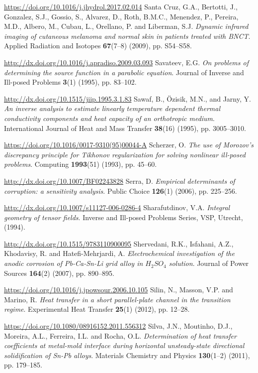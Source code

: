 \begin{thebibliography}{301}
\url{https://doi.org/10.1016/j.jhydrol.2017.02.014}
%
%
 Santa Cruz, G.A., Bertotti, J., Gonzalez, S.J., Gossio, S., Alvarez, D., Roth, B.M.C., Menendez, P., Pereira, M.D., Albero, M., Cubau, L., Orellano, P. and Liberman, S.J. {\it Dynamic infrared imaging of cutaneous melanoma and normal skin in patients treated with BNCT}. Applied Radiation and Isotopes {\bf 67}(7--8) (2009), pp. S54--S58.

\url{http://dx.doi.org/10.1016/j.apradiso.2009.03.093}
%
%
 Savateev, E.G. {\it On problems of determining the source function in a parabolic equation}. Journal of Inverse and Ill-posed Problems {\bf 3}(1) (1995), pp. 83--102.

\url{http://dx.doi.org/10.1515/jiip.1995.3.1.83}
%
%
 Sawaf, B., \"Ozisik, M.N., and Jarny, Y. {\it An inverse analysis to estimate linearly temperature dependent thermal conductivity components and heat capacity of an orthotropic medium}. International Journal of Heat and Mass Transfer {\bf 38}(16) (1995), pp. 3005--3010.

\url{https://doi.org/10.1016/0017-9310(95)00044-A}
%
%
 Scherzer, O. {\it The use of Morozov's discrepancy principle for Tikhonov regularization for solving nonlinear ill-posed problems}. Computing {\bf 1993}(51) (1993), pp. 45--60.

\url{http://dx.doi.org/10.1007/BF02243828}
%
%
 Serra, D. {\it Empirical determinants of corruption: a sensitivity analysis}. Public Choice {\bf 126}(1) (2006), pp. 225--256.

\url{http://dx.doi.org/10.1007/s11127-006-0286-4}
%
%
 Sharafutdinov, V.A. {\it Integral geometry of tensor fields}. Inverse and Ill-posed Problems Series, VSP, Utrecht, (1994).

\url{http://dx.doi.org/10.1515/9783110900095}
%
%
 Shervedani, R.K., Isfahani, A.Z., Khodavisy, R. and Hatefi-Mehrjardi, A. {\it Electrochemical investigation of the anodic corrosion of Pb-Ca-Sn-Li grid alloy in $H_2SO_4$ solution}. Journal of Power Sources {\bf 164}(2) (2007), pp. 890--895.

\url{https://doi.org/10.1016/j.jpowsour.2006.10.105}
%
%
 Silin, N., Masson, V.P. and Marino, R. {\it Heat transfer in a short parallel-plate channel in the transition regime}. Experimental Heat Transfer {\bf 25}(1) (2012), pp. 12--28.

\url{https://doi.org/10.1080/08916152.2011.556312}
%
%
 Silva, J.N., Moutinho, D.J., Moreira, A.L., Ferreira, I.L. and Rocha, O.L. {\it Determination of heat transfer coefficients at metal-mold interface during horizontal unsteady-state directional solidification of Sn-Pb alloys}. Materials Chemistry and Physics {\bf 130}(1--2) (2011), pp. 179--185.


\end{thebibliography}
